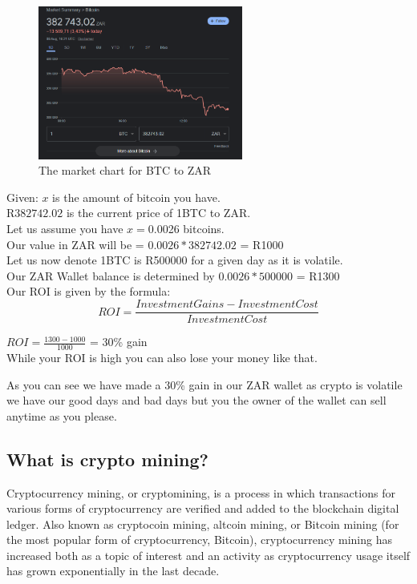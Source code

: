 \begin{figure}[H]
\centering
\includegraphics[width=0.6\textwidth]{images/btcmarket.png}
\caption{The market chart for BTC to ZAR}
\label{fig:bitcoin-market-chart}
\end{figure}

Given: 
$x$ is the amount of bitcoin you have. \\

R$382 742.02$ is the current price of 1BTC to ZAR. \\

Let us assume you have $x=$0.0026 bitcoins. \\

Our value in ZAR will be = $0.0026 * 382 742.02$ = R1000 \\

Let us now denote 1BTC is R500000 for a given day as it is volatile. \\
 
Our ZAR Wallet balance is determined by $0.0026 * 500000$ = R1300 \\

Our ROI is given by the formula:
\begin{equation}
    ROI = \frac{InvestmentGains-InvestmentCost}{InvestmentCost}
\end{equation}

$ ROI = \frac{1300-1000}{1000}$ = 30\% gain \\

While your ROI is high you can also lose your money like that.

As you can see we have made a 30\% gain in our ZAR wallet as crypto is volatile we have our good days and bad days but you the owner of the wallet can sell anytime as you please.

\subsection{What is crypto mining?}
Cryptocurrency mining, or cryptomining, is a process in which
transactions for various forms of cryptocurrency are verified and
added to the blockchain digital ledger. Also known as cryptocoin mining,
altcoin mining, or Bitcoin mining (for the most popular form of 
cryptocurrency, Bitcoin), cryptocurrency mining has increased both as a
topic of interest and an activity as cryptocurrency usage itself has 
grown exponentially in the last decade.

